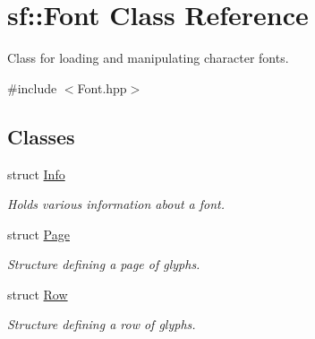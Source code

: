 \hypertarget{classsf_1_1_font}{}\section{sf\+:\+:Font Class Reference}
\label{classsf_1_1_font}


Class for loading and manipulating character fonts.  




{\ttfamily \#include $<$Font.\+hpp$>$}

\subsection*{Classes}
\begin{DoxyCompactItemize}
\item 
struct \mbox{\hyperlink{structsf_1_1_font_1_1_info}{Info}}
\begin{DoxyCompactList}\small\item\em Holds various information about a font. \end{DoxyCompactList}\item 
struct \mbox{\hyperlink{structsf_1_1_font_1_1_page}{Page}}
\begin{DoxyCompactList}\small\item\em Structure defining a page of glyphs. \end{DoxyCompactList}\item 
struct \mbox{\hyperlink{structsf_1_1_font_1_1_row}{Row}}
\begin{DoxyCompactList}\small\item\em Structure defining a row of glyphs. \end{DoxyCompactList}\end{DoxyCompactItemize}
